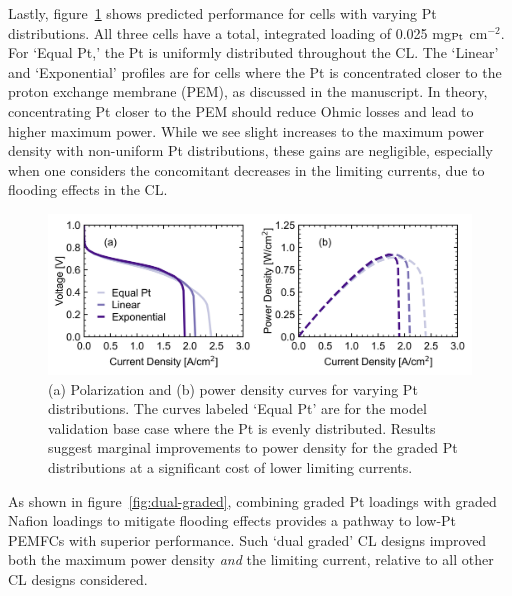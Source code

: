 \documentclass[final,3p,times,onecolumn]{elsarticle}    %
\newcommand{\crr}[1]{\color{red} #1 \color{black}} %
\begin{document}
Lastly, figure~\ref{fig:Pt-distribution-study} shows predicted performance for cells with varying Pt distributions. All three cells have a total, integrated loading of 0.025 mg$_{\rm Pt}$ cm$^{-2}$.  For `Equal Pt,' the Pt is uniformly distributed throughout the CL.  The `Linear' and `Exponential' profiles are for cells where the Pt is concentrated closer to the proton exchange membrane (PEM), as discussed in the manuscript. In theory, concentrating Pt closer to the PEM should reduce Ohmic losses and lead to higher maximum power. While we see slight increases to the maximum power density with non-uniform Pt distributions, these gains are negligible, especially when one considers the concomitant decreases in the limiting currents, due to flooding effects in the CL.
\begin{figure}[H]
    \centering
    \includegraphics[width=5.718in]{figures_uniform/pt-distribution-5_718in.png}
    \crr{
    \caption{(a) Polarization and (b) power density curves for varying Pt distributions. The curves labeled `Equal Pt' are for the model validation base case where the Pt is evenly distributed. Results suggest marginal improvements to power density for the graded Pt distributions at a significant cost of lower limiting currents.}}
    \label{fig:Pt-distribution-study}
\end{figure}

As shown in figure~\ref{fig:dual-graded}, combining graded Pt loadings with graded Nafion loadings to mitigate flooding effects provides a pathway to low-Pt PEMFCs with superior performance. Such `dual graded' CL designs improved both the maximum power density \emph{and} the limiting current, relative to all other CL designs considered. 



\end{document}
